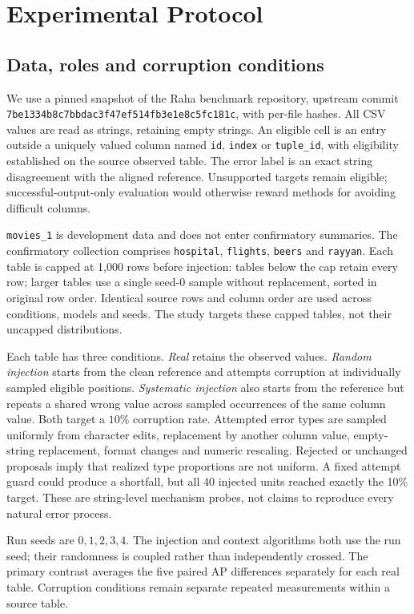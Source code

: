 \section{Experimental Protocol}
\subsection{Data, roles and corruption conditions}
We use a pinned snapshot of the Raha benchmark repository, upstream commit
\texttt{7be1334b8c7bbdac3f47ef514fb3e1e8c5fc181c}, with per-file hashes.
All CSV values are read as strings, retaining empty strings. An eligible cell is
an entry outside a uniquely valued column named \texttt{id}, \texttt{index} or
\texttt{tuple\_id}, with eligibility established on the source observed table.
The error label is an exact string disagreement with the aligned reference.
Unsupported targets remain eligible; successful-output-only evaluation would
otherwise reward methods for avoiding difficult columns.

\texttt{movies\_1} is development data and does not enter confirmatory summaries.
The confirmatory collection comprises \texttt{hospital}, \texttt{flights},
\texttt{beers} and \texttt{rayyan}. Each table is capped at 1,000 rows before
injection: tables below the cap retain every row; larger tables use a single
seed-0 sample without replacement, sorted in original row order. Identical
source rows and column order are used across conditions, models and seeds.
The study targets these capped tables, not their uncapped distributions.

Each table has three conditions. \emph{Real} retains the observed values.
\emph{Random injection} starts from the clean reference and attempts corruption
at individually sampled eligible positions. \emph{Systematic injection} also
starts from the reference but repeats a shared wrong value across sampled
occurrences of the same column value. Both target a $10\%$ corruption rate.
Attempted error types are sampled uniformly from character edits, replacement
by another column value, empty-string replacement, format changes and numeric
rescaling. Rejected or unchanged proposals imply that realized type proportions
are not uniform. A fixed attempt guard could produce a shortfall, but all 40
injected units reached exactly the 10\% target. These are
string-level mechanism probes, not claims to reproduce every natural error process.

Run seeds are $0,1,2,3,4$. The injection and context algorithms both use the
run seed; their randomness is coupled rather than independently crossed.
The primary contrast averages the five paired AP differences separately for
each real table. Corruption conditions remain separate repeated measurements
within a source table.

